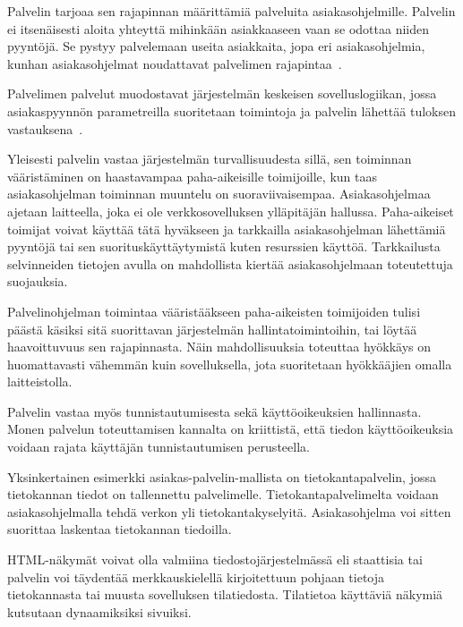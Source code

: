\documentclass[finnish]{tktltiki2}
\theoremstyle{definition}
\theoremstyle{remark}
\begin{document}
Palvelin tarjoaa sen rajapinnan määrittämiä palveluita asiakasohjelmille.
Palvelin ei itsenäisesti aloita yhteyttä mihinkään
asiakkaaseen vaan se odottaa niiden pyyntöjä.
Se pystyy palvelemaan useita asiakkaita, jopa
eri asiakasohjelmia, kunhan asiakasohjelmat noudattavat
palvelimen rajapintaa~\cite{sinha_client-server_1992}.

Palvelimen palvelut muodostavat järjestelmän keskeisen
sovelluslogiikan, jossa asiakaspyynnön parametreilla
suoritetaan toimintoja ja palvelin lähettää
tuloksen vastauksena~\cite{sinha_client-server_1992}.

Yleisesti palvelin vastaa järjestelmän turvallisuudesta sillä,
sen toiminnan vääristäminen on haastavampaa paha-aikeisille
toimijoille, kun taas asiakasohjelman toiminnan muuntelu on suoraviivaisempaa.
Asiakasohjelmaa ajetaan laitteella, joka ei ole verkkosovelluksen
ylläpitäjän hallussa. Paha-aikeiset toimijat voivat käyttää tätä hyväkseen
ja tarkkailla asiakasohjelman lähettämiä pyyntöjä tai sen
suorituskäyttäytymistä kuten resurssien käyttöä.
Tarkkailusta selvinneiden tietojen avulla on mahdollista
kiertää asiakasohjelmaan toteutettuja suojauksia.

Palvelinohjelman toimintaa vääristääkseen
paha-aikeisten toimijoiden tulisi päästä
käsiksi sitä suorittavan järjestelmän hallintatoimintoihin, tai
löytää haavoittuvuus sen rajapinnasta. Näin mahdollisuuksia
toteuttaa hyökkäys on huomattavasti vähemmän kuin sovelluksella, jota
suoritetaan hyökkääjien omalla laitteistolla.

Palvelin vastaa myös tunnistautumisesta sekä käyttöoikeuksien hallinnasta.
Monen palvelun toteuttamisen kannalta on kriittistä, että
tiedon käyttöoikeuksia voidaan rajata käyttäjän tunnistautumisen perusteella.

Yksinkertainen esimerkki asiakas-palvelin-mallista on tietokantapalvelin,
jossa tietokannan tiedot on tallennettu palvelimelle. Tietokantapalvelimelta
voidaan asiakasohjelmalla tehdä verkon yli tietokantakyselyitä. Asiakasohjelma
voi sitten suorittaa laskentaa tietokannan tiedoilla.



HTML-näkymät voivat olla valmiina tiedostojärjestelmässä eli staattisia tai
palvelin voi täydentää merkkauskielellä kirjoitettuun pohjaan
tietoja tietokannasta tai muusta sovelluksen tilatiedosta. 
Tilatietoa käyttäviä näkymiä kutsutaan dynaamiksiksi sivuiksi.

\end{document}

